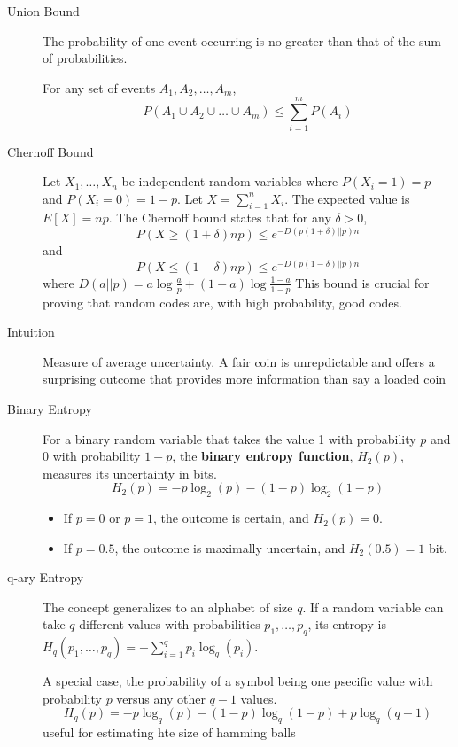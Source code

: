 
\begin{description}
    \item[Union Bound] The probability of one event occurring is no greater than that of the sum of probabilities.

    For any set of events $A_1, A_2, \dots, A_m$,
    \[
        P(A_1 \cup A_2 \cup \dots \cup A_m) \le \sum_{i=1}^m P(A_i)
    \]

    \item[Chernoff Bound] Let $X_1, \dots, X_n$ be independent random variables where $P(X_i=1) = p$ and $P(X_i=0) = 1-p$. Let $X = \sum_{i=1}^n X_i$. The expected value is $E[X] = np$. 
        The Chernoff bound states that for any $\delta > 0$,
    \[
        P(X \ge (1+\delta)np) \le e^{-D(p(1+\delta) || p)n}
    \]
    and
    \[
        P(X \le (1-\delta)np) \le e^{-D(p(1-\delta) || p)n}
    \]
    where $D(a || p) = a \log\frac{a}{p} + (1-a)\log\frac{1-a}{1-p}$ This bound is crucial for proving that random codes are, with high probability, good codes.
\end{description}

\begin{description}
    \item[Intuition] Measure of average uncertainty. A fair coin is unrepdictable and offers a surprising outcome that provides more information than say a loaded coin
    \item[Binary Entropy] For a binary random variable that takes the value 1 with probability $p$ and 0 with probability $1-p$, the \textbf{binary entropy function}, $H_2(p)$, measures its uncertainty in bits.
    \[
        H_2(p) = -p \log_2(p) - (1-p) \log_2(1-p)
    \]
    \begin{itemize}
        \item If $p=0$ or $p=1$, the outcome is certain, and $H_2(p) = 0$.
        \item If $p=0.5$, the outcome is maximally uncertain, and $H_2(0.5) = 1$ bit.
    \end{itemize}
    \item[q-ary Entropy] The concept generalizes to an alphabet of size $q$. If a random variable can take $q$ different values with probabilities $p_1, \dots, p_q$, its entropy is $H_q(p_1, \dots, p_q) = -\sum_{i=1}^q p_i \log_q(p_i)$.
    
    A special case, the probability of a symbol being one psecific value with probability $p$ versus any other $q - 1$ values.
    \[
        H_q(p) = -p\log_q(p) - (1-p)\log_q(1-p) + p\log_q(q-1)
    \]
    useful for estimating hte size of hamming balls
\end{description}

